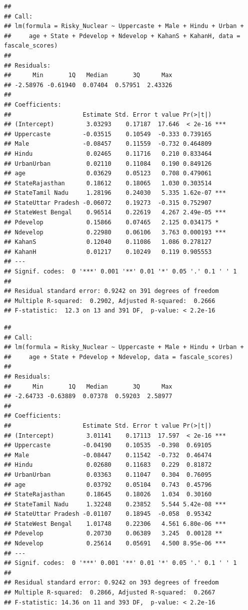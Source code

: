 \documentclass[
]{article}
\begin{document}
\begin{verbatim}
## 
## Call:
## lm(formula = Risky_Nuclear ~ Uppercaste + Male + Hindu + Urban + 
##     age + State + Pdevelop + Ndevelop + KahanS + KahanH, data = fascale_scores)
## 
## Residuals:
##      Min       1Q   Median       3Q      Max 
## -2.58976 -0.61940  0.07404  0.57951  2.43326 
## 
## Coefficients:
##                    Estimate Std. Error t value Pr(>|t|)    
## (Intercept)         3.03293    0.17187  17.646  < 2e-16 ***
## Uppercaste         -0.03515    0.10549  -0.333 0.739165    
## Male               -0.08457    0.11559  -0.732 0.464809    
## Hindu               0.02465    0.11716   0.210 0.833464    
## UrbanUrban          0.02110    0.11084   0.190 0.849126    
## age                 0.03629    0.05123   0.708 0.479061    
## StateRajasthan      0.18612    0.18065   1.030 0.303514    
## StateTamil Nadu     1.28196    0.24030   5.335 1.62e-07 ***
## StateUttar Pradesh -0.06072    0.19273  -0.315 0.752907    
## StateWest Bengal    0.96514    0.22619   4.267 2.49e-05 ***
## Pdevelop            0.15866    0.07465   2.125 0.034175 *  
## Ndevelop            0.22980    0.06106   3.763 0.000193 ***
## KahanS              0.12040    0.11086   1.086 0.278127    
## KahanH              0.01217    0.10249   0.119 0.905553    
## ---
## Signif. codes:  0 '***' 0.001 '**' 0.01 '*' 0.05 '.' 0.1 ' ' 1
## 
## Residual standard error: 0.9242 on 391 degrees of freedom
## Multiple R-squared:  0.2902, Adjusted R-squared:  0.2666 
## F-statistic:  12.3 on 13 and 391 DF,  p-value: < 2.2e-16
\end{verbatim}

\begin{verbatim}
## 
## Call:
## lm(formula = Risky_Nuclear ~ Uppercaste + Male + Hindu + Urban + 
##     age + State + Pdevelop + Ndevelop, data = fascale_scores)
## 
## Residuals:
##      Min       1Q   Median       3Q      Max 
## -2.64733 -0.63889  0.07378  0.59203  2.58977 
## 
## Coefficients:
##                    Estimate Std. Error t value Pr(>|t|)    
## (Intercept)         3.01141    0.17113  17.597  < 2e-16 ***
## Uppercaste         -0.04190    0.10535  -0.398  0.69105    
## Male               -0.08447    0.11542  -0.732  0.46474    
## Hindu               0.02680    0.11683   0.229  0.81872    
## UrbanUrban          0.03363    0.11047   0.304  0.76095    
## age                 0.03792    0.05104   0.743  0.45796    
## StateRajasthan      0.18645    0.18026   1.034  0.30160    
## StateTamil Nadu     1.32248    0.23852   5.544 5.42e-08 ***
## StateUttar Pradesh -0.01107    0.18945  -0.058  0.95342    
## StateWest Bengal    1.01748    0.22306   4.561 6.80e-06 ***
## Pdevelop            0.20730    0.06389   3.245  0.00128 ** 
## Ndevelop            0.25614    0.05691   4.500 8.95e-06 ***
## ---
## Signif. codes:  0 '***' 0.001 '**' 0.01 '*' 0.05 '.' 0.1 ' ' 1
## 
## Residual standard error: 0.9242 on 393 degrees of freedom
## Multiple R-squared:  0.2866, Adjusted R-squared:  0.2667 
## F-statistic: 14.36 on 11 and 393 DF,  p-value: < 2.2e-16
\end{verbatim}
\end{document}
